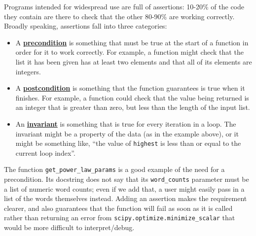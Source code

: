 \documentclass[
]{krantz}
\newcommand{\gref}[2]{\hyperlink{#2}{\textbf{#1}}}
\begin{document}
Programs intended for widespread use are full of assertions:
10-20\% of the code they contain are there to check that the other 80-90\% are working correctly.
Broadly speaking, assertions fall into three categories:

\begin{itemize}
\item
  A \gref{precondition}{precondition}
  is something that must be true at the start of a function
  in order for it to work correctly.
  For example,
  a function might check that the list it has been given has at least two elements
  and that all of its elements are integers.
\item
  A \gref{postcondition}{postcondition}
  is something that the function guarantees is true
  when it finishes.
  For example,
  a function could check that the value being returned is an integer
  that is greater than zero,
  but less than the length of the input list.
\item
  An \gref{invariant}{invariant}
  is something that is true for every iteration in a loop.
  The invariant might be a property of the data (as in the example above),
  or it might be something like,
  ``the value of \texttt{highest} is less than or equal to the current loop index''.
\end{itemize}

The function \texttt{get\_power\_law\_params} is a good example of the need for a precondition.
Its docstring does not say that its \texttt{word\_counts} parameter must be a list of numeric word counts;
even if we add that,
a user might easily pass in a list of the words themselves instead.
Adding an assertion makes the requirement clearer,
and also guarantees that the function will fail as soon as it is called
rather than returning an error from \texttt{scipy.optimize.minimize\_scalar}
that would be more difficult to interpret/debug.
\end{document}
